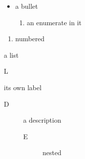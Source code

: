 \documentclass{article}
\begin{document}
\begin{itemize}
\item a bullet
\begin{enumerate}
\item an enumerate in it
\end{enumerate}
\end{itemize}
\begin{enumerate}
\item numbered
\end{enumerate}
\begin{list}{}{}
\item[X] a list
\end{list}
\begin{list}{L}{\def\makelabel#1{[#1]}}
\item[Z] its own label
\end{list}
\begin{description}
\item[D] a description
\begin{description}
\item[E] nested
\end{description}
\end{description}
\end{document}
